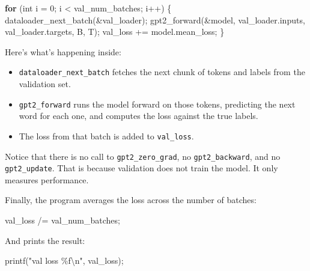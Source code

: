 \documentclass[
  letterpaper,
  DIV=11,
  numbers=noendperiod]{scrreprt}
\newenvironment{Shaded}{\begin{snugshade}}{\end{snugshade}}
\newcommand{\ControlFlowTok}[1]{\textcolor[rgb]{0.00,0.23,0.31}{\textbf{#1}}}
\newcommand{\DataTypeTok}[1]{\textcolor[rgb]{0.68,0.00,0.00}{#1}}
\newcommand{\DecValTok}[1]{\textcolor[rgb]{0.68,0.00,0.00}{#1}}
\newcommand{\NormalTok}[1]{\textcolor[rgb]{0.00,0.23,0.31}{#1}}
\newcommand{\OperatorTok}[1]{\textcolor[rgb]{0.37,0.37,0.37}{#1}}
\newcommand{\SpecialCharTok}[1]{\textcolor[rgb]{0.37,0.37,0.37}{#1}}
\newcommand{\StringTok}[1]{\textcolor[rgb]{0.13,0.47,0.30}{#1}}
\providecommand{\tightlist}{%
  \setlength{\itemsep}{0pt}\setlength{\parskip}{0pt}}
\begin{document}
\begin{Shaded}
\begin{Highlighting}[]
\ControlFlowTok{for} \OperatorTok{(}\DataTypeTok{int}\NormalTok{ i }\OperatorTok{=} \DecValTok{0}\OperatorTok{;}\NormalTok{ i }\OperatorTok{\textless{}}\NormalTok{ val\_num\_batches}\OperatorTok{;}\NormalTok{ i}\OperatorTok{++)} \OperatorTok{\{}
\NormalTok{    dataloader\_next\_batch}\OperatorTok{(\&}\NormalTok{val\_loader}\OperatorTok{);}
\NormalTok{    gpt2\_forward}\OperatorTok{(\&}\NormalTok{model}\OperatorTok{,}\NormalTok{ val\_loader}\OperatorTok{.}\NormalTok{inputs}\OperatorTok{,}\NormalTok{ val\_loader}\OperatorTok{.}\NormalTok{targets}\OperatorTok{,}\NormalTok{ B}\OperatorTok{,}\NormalTok{ T}\OperatorTok{);}
\NormalTok{    val\_loss }\OperatorTok{+=}\NormalTok{ model}\OperatorTok{.}\NormalTok{mean\_loss}\OperatorTok{;}
\OperatorTok{\}}
\end{Highlighting}
\end{Shaded}

Here's what's happening inside:

\begin{itemize}
\tightlist
\item
  \texttt{dataloader\_next\_batch} fetches the next chunk of tokens and
  labels from the validation set.
\item
  \texttt{gpt2\_forward} runs the model forward on those tokens,
  predicting the next word for each one, and computes the loss against
  the true labels.
\item
  The loss from that batch is added to \texttt{val\_loss}.
\end{itemize}

Notice that there is no call to \texttt{gpt2\_zero\_grad}, no
\texttt{gpt2\_backward}, and no \texttt{gpt2\_update}. That is because
validation does not train the model. It only measures performance.

Finally, the program averages the loss across the number of batches:

\begin{Shaded}
\begin{Highlighting}[]
\NormalTok{val\_loss }\OperatorTok{/=}\NormalTok{ val\_num\_batches}\OperatorTok{;}
\end{Highlighting}
\end{Shaded}

And prints the result:

\begin{Shaded}
\begin{Highlighting}[]
\NormalTok{printf}\OperatorTok{(}\StringTok{"val loss }\SpecialCharTok{\%f\textbackslash{}n}\StringTok{"}\OperatorTok{,}\NormalTok{ val\_loss}\OperatorTok{);}
\end{Highlighting}
\end{Shaded}
\end{document}
